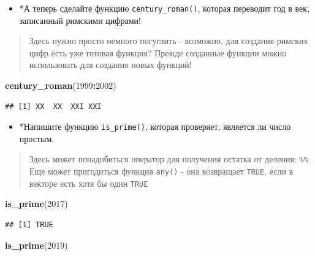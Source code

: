 \documentclass[]{book}
\newenvironment{Shaded}{\begin{snugshade}}{\end{snugshade}}
\newcommand{\KeywordTok}[1]{\textcolor[rgb]{0.13,0.29,0.53}{\textbf{#1}}}
\newcommand{\DecValTok}[1]{\textcolor[rgb]{0.00,0.00,0.81}{#1}}
\newcommand{\OperatorTok}[1]{\textcolor[rgb]{0.81,0.36,0.00}{\textbf{#1}}}
\newcommand{\NormalTok}[1]{#1}
\providecommand{\tightlist}{%
  \setlength{\itemsep}{0pt}\setlength{\parskip}{0pt}}
\begin{document}
\begin{itemize}
\tightlist
\item
  *А теперь сделайте функцию \texttt{century\_roman()}, которая
  переводит год в век, записанный римскими цифрами!
\end{itemize}

\begin{quote}
Здесь нужно просто немного погуглить - возможно, для создания римских
цифр есть уже готовая функция? Прежде созданные функции можно
использовать для создания новых функций!
\end{quote}

\begin{Shaded}
\begin{Highlighting}[]
\KeywordTok{century_roman}\NormalTok{(}\DecValTok{1999}\OperatorTok{:}\DecValTok{2002}\NormalTok{)}
\end{Highlighting}
\end{Shaded}

\begin{verbatim}
## [1] XX  XX  XXI XXI
\end{verbatim}

\begin{itemize}
\tightlist
\item
  *Напишите функцию \texttt{is\_prime()}, которая проверяет, является ли
  число простым.
\end{itemize}

\begin{quote}
Здесь может понадобиться оператор для получения остатка от деления:
\texttt{\%\%}. Еще может пригодиться функция \texttt{any()} - она
возвращает \texttt{TRUE}, если в векторе есть хотя бы один \texttt{TRUE}
\end{quote}

\begin{Shaded}
\begin{Highlighting}[]
\KeywordTok{is_prime}\NormalTok{(}\DecValTok{2017}\NormalTok{)}
\end{Highlighting}
\end{Shaded}

\begin{verbatim}
## [1] TRUE
\end{verbatim}

\begin{Shaded}
\begin{Highlighting}[]
\KeywordTok{is_prime}\NormalTok{(}\DecValTok{2019}\NormalTok{)}
\end{Highlighting}
\end{Shaded}
\end{document}
